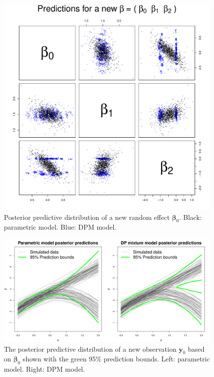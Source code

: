\documentclass[12pt]{article}
\newcommand{\m}[1]{\mathbf{\bm{#1}}}
\begin{document}
\begin{figure}
\begin{center}
\includegraphics[scale=0.45]{../figs/toy_theta_0.pdf}
\caption{Posterior predictive distribution of a new random effect $\m{\beta}_0$. Black: parametric model. Blue: DPM model.}
\label{toy_theta}
\end{center}
\end{figure}

\begin{figure}
\begin{center}
\includegraphics[scale=0.34]{../figs/toy_y_0.pdf}
\caption{The posterior predictive distribution of a new observation $\m{y}_0$ based on $\m{\beta}_0$ shown with the green 95\% prediction bounds. Left: parametric model. Right: DPM model.}
\label{toy_y}
\end{center}
\end{figure}
\end{document}

